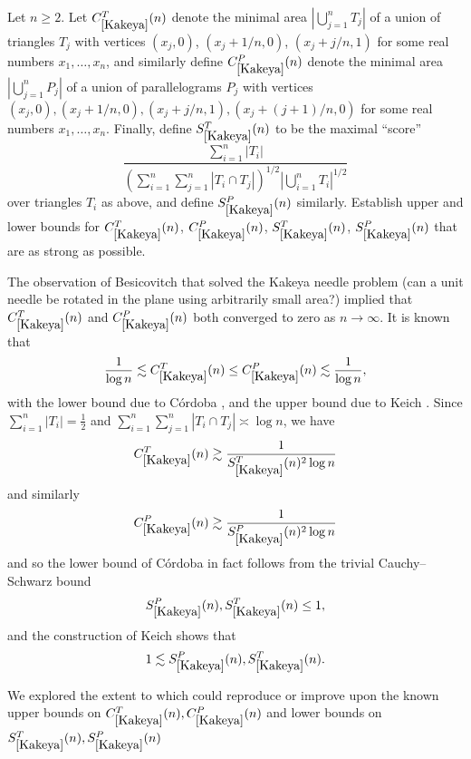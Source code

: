 \begin{problem}\label{Kakeya} Let $n \geq 2$.  Let $C_{\ref{Kakeya}}^T(n)$ denote the minimal area $|\bigcup_{j=1}^n T_j|$ of a union of triangles $T_j$ with vertices
$(x_j,0)$, $(x_j + 1/n, 0)$, $(x_j + j/n, 1)$ for some real numbers $x_1,\dots,x_n$, and similarly define $C_{\ref{Kakeya}}^P(n)$ denote the minimal area $|\bigcup_{j=1}^n P_j|$ of a union of parallelograms $P_j$ with vertices
$(x_j,0), (x_j+1/n,0), (x_j+j/n,1), (x_j+(j+1)/n,0)$ for some real numbers $x_1,\dots,x_n$.  Finally, define $S_{\ref{Kakeya}}^T(n)$ to be the maximal ``score''
$$ \frac{\sum_{i=1}^n |T_i|}{\left(\sum_{i=1}^n \sum_{j=1}^n |T_i \cap T_j|\right)^{1/2} |\bigcup_{i=1}^n T_i|^{1/2}}$$
over triangles $T_i$ as above, and define $S_{\ref{Kakeya}}^P(n)$ similarly.
Establish upper and lower bounds for $C_{\ref{Kakeya}}^T(n)$, $C_{\ref{Kakeya}}^P(n)$, $S_{\ref{Kakeya}}^T(n)$, $S_{\ref{Kakeya}}^P(n)$ that are as strong as possible.
\end{problem}

The observation of Besicovitch \cite{besicovitch} that solved the Kakeya needle problem (can a unit needle be rotated in the plane using arbitrarily small area?) implied that $C_{\ref{Kakeya}}^T(n)$ and  $C_{\ref{Kakeya}}^P(n)$ both converged to zero as $n \to \infty$.  It is known that
$$ \frac{1}{\log n} \lesssim C_{\ref{Kakeya}}^T(n) \leq C_{\ref{Kakeya}}^P(n) \lesssim \frac{1}{\log n},$$
with the lower bound due to C\'ordoba \cite{cordoba}, and the upper bound due to Keich \cite{keich}.  Since $\sum_{i=1}^n |T_i| = \frac{1}{2}$ and $\sum_{i=1}^n \sum_{j=1}^n |T_i \cap T_j| \asymp \log n$, we have
$$ C_{\ref{Kakeya}}^T(n) \gtrsim \frac{1}{S_{\ref{Kakeya}}^T(n)^2 \log n}$$
and similarly
$$ C_{\ref{Kakeya}}^P(n) \gtrsim \frac{1}{S_{\ref{Kakeya}}^P(n)^2 \log n}$$
and so the lower bound of C\'ordoba in fact follows from the trivial Cauchy--Schwarz bound
$$S_{\ref{Kakeya}}^P(n), S_{\ref{Kakeya}}^T(n) \leq 1,$$
and the construction of Keich shows that
$$1 \lesssim S_{\ref{Kakeya}}^P(n), S_{\ref{Kakeya}}^T(n).$$

We explored the extent to which \AlphaEvolve could reproduce or improve upon the known upper bounds on $C_{\ref{Kakeya}}^T(n), C_{\ref{Kakeya}}^P(n)$ and lower bounds on $S_{\ref{Kakeya}}^T(n), S_{\ref{Kakeya}}^P(n)$


